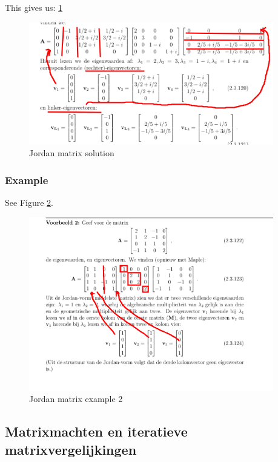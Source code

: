 \documentclass[a4paper]{article}
\begin{document}
This gives us: \ref{fig:jordan_sol}

\begin{figure}[htbp!]
	\begin{center}
		\includegraphics[width=0.95\textwidth]{./images/sol_jordan.png}
	\end{center}
	\caption{Jordan matrix solution}
	\label{fig:jordan_sol}
\end{figure}

\subsubsection{Example}

See Figure \ref{fig:jordan_ex_2}.
\begin{figure}[htbp!]
	\begin{center}
		\includegraphics[width=0.95\textwidth]{./images/jordan_ex_2.png}
	\end{center}
	\caption{Jordan matrix example 2}
	\label{fig:jordan_ex_2}
\end{figure}

\subsection{Matrixmachten en iteratieve matrixvergelijkingen}
\end{document}

